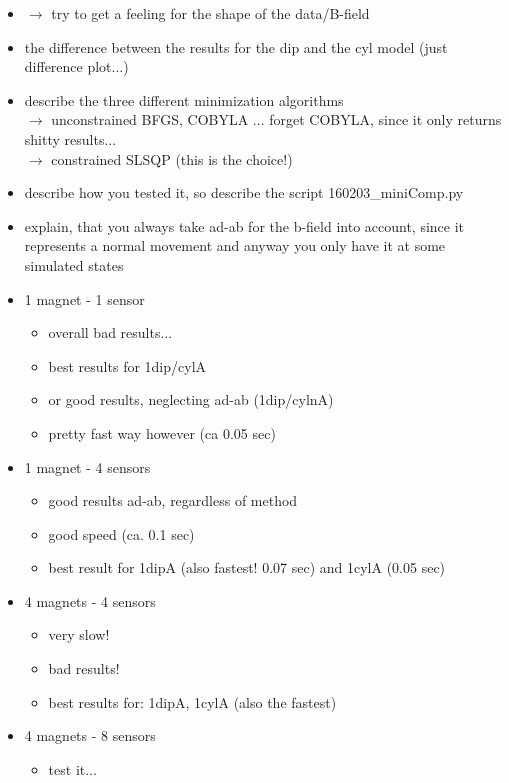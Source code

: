 \begin{itemize}
\item $ \rightarrow $ try to get a feeling for the shape of the data/B-field
\item the difference between the results for the dip and the cyl model (just difference plot...)

\item describe the three different minimization algorithms \\
	$ \rightarrow $ unconstrained BFGS, COBYLA ... forget COBYLA, since it only returns shitty results...\\
	$ \rightarrow $ constrained SLSQP (this is the choice!)
	
\item describe how you tested it, so describe the script 160203\_miniComp.py
\item explain, that you always take ad-ab for the b-field into account, since it represents a normal movement and anyway you only have it at some simulated states

\item 1 magnet - 1 sensor
	\begin{itemize}
	\item overall bad results...
	\item best results for 1dip/cylA
	\item or good results, neglecting ad-ab (1dip/cylnA)
	\item pretty fast way however (ca 0.05 sec)
	\end{itemize}
\item 1 magnet - 4 sensors
	\begin{itemize}
	\item good results ad-ab, regardless of method	
	\item good speed (ca. 0.1 sec)
	\item best result for 1dipA (also fastest! 0.07 sec) and 1cylA (0.05 sec)
	\end{itemize}
\item 4 magnets - 4 sensors
	\begin{itemize}
	\item very slow! 
	\item bad results!
	\item best results for: 1dipA, 1cylA (also the fastest)
	\end{itemize}
	
\item 4 magnets - 8 sensors
	\begin{itemize}
	\item test it...
	\end{itemize}	
	

\end{itemize}
